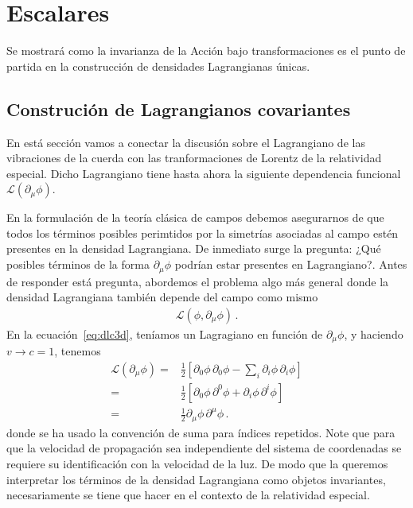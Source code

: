 \chapter{Escalares}

Se mostrará como la invarianza de la Acción bajo transformaciones es el punto de partida en la construcción de densidades Lagrangianas únicas.




 

\section{Construción de Lagrangianos covariantes}
En está sección vamos a conectar la discusión sobre el Lagrangiano de las vibraciones de la cuerda con las tranformaciones de Lorentz de la relatividad especial. Dicho Lagrangiano tiene hasta ahora la siguiente dependencia funcional $\mathcal{L}(\partial_{\mu}\phi)$.

En la formulación de la teoría clásica de campos debemos asegurarnos de que todos los términos posibles perimtidos por la simetrías asociadas al campo estén presentes en la densidad Lagrangiana. De inmediato surge la pregunta: ¿Qué posibles términos de la forma $\partial_{\mu}\phi$ podrían estar presentes en Lagrangiano?. Antes de responder está pregunta, abordemos el problema algo más general donde la densidad Lagrangiana también depende del campo como mismo
\begin{align*}
  \mathcal{L}(\phi,\partial_\mu \phi)\,.
\end{align*}
En la ecuación~\eqref{eq:dlc3d}, teníamos un Lagragiano en función de $\partial_{\mu}\phi$, y haciendo $v\to c=1$, tenemos
\begin{align}
\label{eq:Lpr}
  \mathcal{L}(\partial_{\mu}\phi)
    =&\frac{1}{2}\left[
      {\partial_0\phi}\,{\partial_0\phi}-\sum_i{\partial_i\phi}\,{\partial_i\phi}
   \right]\nonumber\\
    =&\frac{1}{2}\left[
      {\partial_0\phi}\,{\partial^0\phi}+{\partial_i\phi}\,{\partial^i\phi}
   \right]\nonumber\\
   =&\frac{1}{2}{\partial_\mu\phi}\,{\partial^\mu\phi}\,.
\end{align}
donde se ha usado la convención de suma para índices repetidos. Note que para que la velocidad de propagación sea independiente del sistema de coordenadas se requiere su identificación con la velocidad de la luz. De modo que la queremos interpretar los términos de la densidad Lagrangiana como objetos invariantes, necesariamente se tiene que hacer en el contexto de la relatividad especial.


